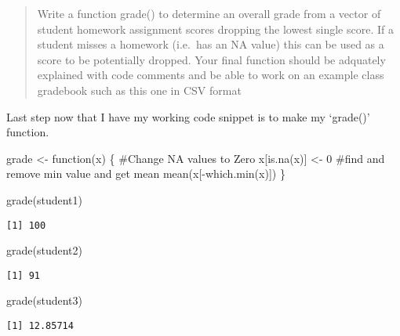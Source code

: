 \documentclass[
  letterpaper,
  DIV=11,
  numbers=noendperiod]{scrartcl}
\newenvironment{Shaded}{\begin{snugshade}}{\end{snugshade}}
\newcommand{\CommentTok}[1]{\textcolor[rgb]{0.37,0.37,0.37}{#1}}
\newcommand{\ControlFlowTok}[1]{\textcolor[rgb]{0.00,0.23,0.31}{#1}}
\newcommand{\DecValTok}[1]{\textcolor[rgb]{0.68,0.00,0.00}{#1}}
\newcommand{\FunctionTok}[1]{\textcolor[rgb]{0.28,0.35,0.67}{#1}}
\newcommand{\NormalTok}[1]{\textcolor[rgb]{0.00,0.23,0.31}{#1}}
\newcommand{\OtherTok}[1]{\textcolor[rgb]{0.00,0.23,0.31}{#1}}
\newcommand{\SpecialCharTok}[1]{\textcolor[rgb]{0.37,0.37,0.37}{#1}}
\begin{document}
\begin{quote}
Write a function grade() to determine an overall grade from a vector of
student homework assignment scores dropping the lowest single score. If
a student misses a homework (i.e.~has an NA value) this can be used as a
score to be potentially dropped. Your final function should be adquately
explained with code comments and be able to work on an example class
gradebook such as this one in CSV format
\end{quote}

Last step now that I have my working code snippet is to make my
`grade()' function.

\begin{Shaded}
\begin{Highlighting}[]
\NormalTok{grade }\OtherTok{\textless{}{-}} \ControlFlowTok{function}\NormalTok{(x) \{}
\CommentTok{\#Change NA values to Zero}
\NormalTok{x[}\FunctionTok{is.na}\NormalTok{(x)] }\OtherTok{\textless{}{-}} \DecValTok{0}
\CommentTok{\#find and remove min value and get mean}
\FunctionTok{mean}\NormalTok{(x[}\SpecialCharTok{{-}}\FunctionTok{which.min}\NormalTok{(x)])}
\NormalTok{\}}
\end{Highlighting}
\end{Shaded}

\begin{Shaded}
\begin{Highlighting}[]
\FunctionTok{grade}\NormalTok{(student1)}
\end{Highlighting}
\end{Shaded}

\begin{verbatim}
[1] 100
\end{verbatim}

\begin{Shaded}
\begin{Highlighting}[]
\FunctionTok{grade}\NormalTok{(student2)}
\end{Highlighting}
\end{Shaded}

\begin{verbatim}
[1] 91
\end{verbatim}

\begin{Shaded}
\begin{Highlighting}[]
\FunctionTok{grade}\NormalTok{(student3)}
\end{Highlighting}
\end{Shaded}

\begin{verbatim}
[1] 12.85714
\end{verbatim}
\end{document}
